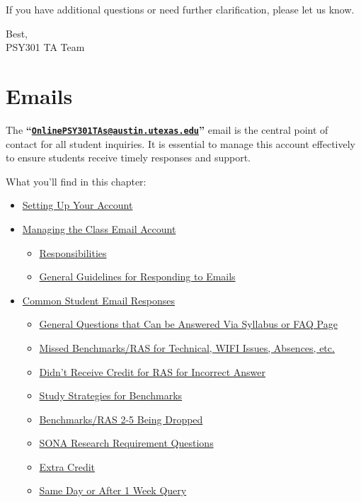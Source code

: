 \documentclass[
]{article}
\providecommand{\tightlist}{%
  \setlength{\itemsep}{0pt}\setlength{\parskip}{0pt}}
\begin{document}
If you have additional questions or need further clarification, please let us know.

Best,\\
PSY301 TA Team

\hypertarget{emails}{%
\section{Emails}\label{emails}}

The \textbf{``\href{mailto:OnlinePSY301TAs@austin.utexas.edu}{\nolinkurl{OnlinePSY301TAs@austin.utexas.edu}}''} email is the central point of contact for all student inquiries. It is essential to manage this account effectively to ensure students receive timely responses and support.

What you'll find in this chapter:

\begin{itemize}
\tightlist
\item
  \protect\hyperlink{setting-up-your-account}{Setting Up Your Account}
\item
  \protect\hyperlink{managing-the-class-email-account}{Managing the Class Email Account}

  \begin{itemize}
  \tightlist
  \item
    \protect\hyperlink{responsibilities}{Responsibilities}
  \item
    \protect\hyperlink{general-guidelines-for-responding-to-emails}{General Guidelines for Responding to Emails}
  \end{itemize}
\item
  \protect\hyperlink{common-student-email-responses}{Common Student Email Responses}

  \begin{itemize}
  \tightlist
  \item
    \protect\hyperlink{general-questions}{General Questions that Can be Answered Via Syllabus or FAQ Page}
  \item
    \protect\hyperlink{missed-benchmarks}{Missed Benchmarks/RAS for Technical, WIFI Issues, Absences, etc.}
  \item
    \protect\hyperlink{didnt-receive-credit}{Didn't Receive Credit for RAS for Incorrect Answer}
  \item
    \protect\hyperlink{study-strategies}{Study Strategies for Benchmarks}
  \item
    \protect\hyperlink{benchmarks-ras-dropped}{Benchmarks/RAS 2-5 Being Dropped}
  \item
    \protect\hyperlink{sona-research}{SONA Research Requirement Questions}
  \item
    \protect\hyperlink{extra-credit}{Extra Credit}
  \item
    \protect\hyperlink{same-day-query}{Same Day or After 1 Week Query}
  \end{itemize}
\end{itemize}
\end{document}
